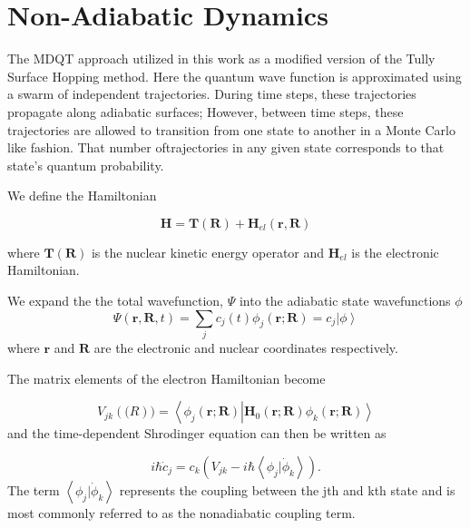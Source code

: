 \section{Non-Adiabatic Dynamics}

The MDQT approach utilized in this work as a modified version of the Tully Surface Hopping method.\cite{tully2012perspective, tully1990molecular}
Here the quantum wave function is approximated using a swarm of independent trajectories.
During time steps, these trajectories propagate along adiabatic surfaces;
However, between time steps, these trajectories are allowed to transition from one state to another in a Monte Carlo like fashion.
That number oftrajectories in any given state corresponds to that state's quantum probability.

We define the Hamiltonian

\begin{equation} \label{eq:tullyHamiltonian} \mathbf{H} = \mathbf{T}(\mathbf{R}) +
  \mathbf{H}_{el}(\mathbf{r},\mathbf{R})
\end{equation}

where \(\mathbf{T}(\mathbf{R}) \) is the nuclear kinetic energy operator and \(\textbf{H}_{el}\) is the electronic Hamiltonian.

We expand the the total wavefunction, \(\Psi\) into the adiabatic state wavefunctions \(\phi\)
\begin{equation}
  \Psi(\textbf{r}, \textbf{R}, t) = \sum_j c_j(t)\phi_j(\textbf{r}; \textbf{R}) = c_j \left| \phi \right>
\end{equation}
where \(\textbf{r}\) and \(\textbf{R}\) are the electronic and nuclear coordinates respectively.


The matrix elements of the electron Hamiltonian become

\begin{equation} \label{eq:tullyVelements}
  V_{jk}(\mathbf(R))=\left<\phi_j(\mathbf{r};\mathbf{R})\right|\mathbf{H}_{0}\left.(\mathbf{r};\mathbf{R})\phi_k(\mathbf{r};\mathbf{R})\right>
\end{equation}
and the time-dependent Shrodinger equation can then be written as

\begin{equation}
  i\hbar\dot{c}_j = c_k ( V_{jk} - i\hbar \left< \phi_j | \dot{\phi}_k \right> ).
\end{equation}
The term \(\left< \phi_j | \dot{\phi}_k \right>\) represents the coupling between the jth and kth state and is most commonly referred to as the nonadiabatic coupling term.

